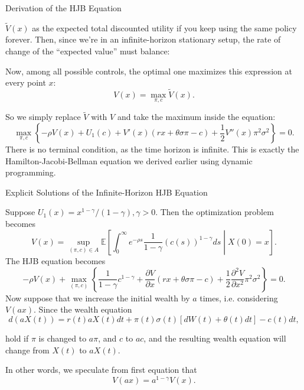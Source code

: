 \documentclass{beamer}
\begin{document}
    \begin{frame}{Derivation of the HJB Equation}


    {\footnotesize \footnotesize
    \(\tilde{V}(x)\) as the expected total discounted utility if you keep using the same policy forever. 
    Then, since we're in an infinite-horizon stationary setup, the rate of change of the ``expected value'' must balance:  
     {\footnotesize \tiny
     \begin{center}
    
     \end{center}
     }
     \pause  Now, among all possible controls, the optimal one maximizes this expression at every point \(x\):  
\[
V(x) = \max_{\pi,c} \tilde{V}(x).
\]

 \pause So we simply replace \(\tilde{V}\) with \(V\) and take the maximum inside the equation:  
\[
\max_{\pi,c} \left\{ -\rho V(x) + U_1(c) + V'(x)(rx + \theta \sigma \pi - c) + \frac{1}{2} V''(x) \pi^2 \sigma^2 \right\} = 0.
\]
There is no terminal condition, as the time horizon is infinite.
This is exactly the Hamilton-Jacobi-Bellman equation we derived earlier using dynamic programming.
        }
    \end{frame}

    \begin{frame}{Explicit Solutions of the Infinite-Horizon HJB Equation}


    {\footnotesize \footnotesize
     Suppose \( U_1(x) = x^{1-\gamma}/(1-\gamma), \gamma > 0 \). Then the optimization problem becomes
      {\footnotesize \tiny
\[
V(x) = \sup_{(\pi, c) \in A} \mathbb{E} \left[ \int_0^\infty e^{-\rho s} \frac{1}{1-\gamma} (c(s))^{1-\gamma} ds \middle| X(0) = x \right].
\]
    }
The HJB equation becomes
 {\footnotesize \tiny
\[
-\rho V(x) + \max_{(\pi,c)} \left\{ \frac{1}{1 - \gamma} c^{1 - \gamma} + \frac{\partial V}{\partial x}(rx + \theta\sigma\pi - c) + \frac{1}{2}\frac{\partial^2 V}{\partial x^2}\pi^2\sigma^2 \right\} = 0.
\]
    }
 \pause Now suppose that we increase the initial wealth by \( a \) times, i.e. considering \( V(ax) \). Since the wealth equation
 {\footnotesize \tiny
\[
d(aX(t)) = r(t)aX(t)dt + \pi(t)\sigma(t)[dW(t) + \theta(t)dt] - c(t)dt,
\]
    }

hold if \( \pi \) is changed to \( a\pi \), and \( c \) to \( ac \), and the resulting 
wealth equation will change from \( X(t) \) to \( aX(t) \).
\par In other words, we speculate from first equation that
\[
V(ax) = a^{1 - \gamma}V(x).
\]
        }
    \end{frame}
\end{document}
